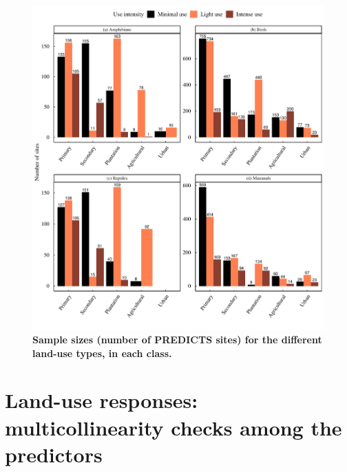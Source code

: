 \documentclass[11pt]{article}
\begin{document}
\begin{figure}[h!]
\centering
\includegraphics[scale=0.7]{Figures/Sample_size_figure}
\caption[]{\textbf{Sample sizes (number of PREDICTS sites) for the different land-use types, in each class.}}
\label{}
\end{figure}

\clearpage
\section{Land-use responses: multicollinearity checks among the predictors}
\end{document}
